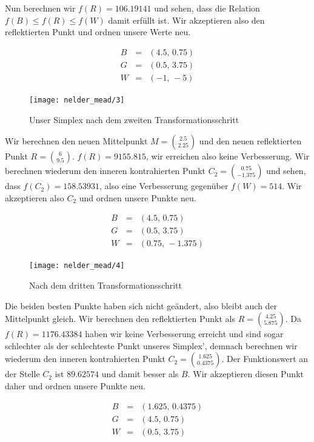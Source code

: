 \documentclass[naustrian]{article}
\begin{document}
{Nun berechnen wir $f(R) = 106.19141$ und sehen, dass die Relation $f(B) \leq
f(R) \leq f(W)$ damit erfüllt ist. Wir akzeptieren also den reflektierten Punkt
und ordnen unsere Werte neu.

\begin{eqnarray*}
    B & = & (4.5, \, 0.75)\\
    G & = & (0.5,\,3.75)\\
    W & = & (-1,\,-5)
\end{eqnarray*}

\begin{figure}[H]
    \centering
    \texttt{[image: nelder\_mead/3]}
    \caption{Unser Simplex nach dem zweiten Transformationsschritt}
\end{figure}

Wir berechnen den neuen Mittelpunkt $M = \binom{2.5}{2.25}$ und den neuen
reflektierten Punkt $R = \binom{6}{9.5}$. $f(R) = 9155.815$, wir erreichen also
keine Verbesserung. Wir berechnen wiederum den inneren kontrahierten Punkt
$C_{2} = \binom{0.75}{-1.375}$ und sehen, dass $f(C_{2}) = 158.53931$, also
eine Verbesserung gegenüber $f(W) = 514$. Wir akzeptieren also $C_{2}$ und
ordnen unsere Punkte neu.

\begin{eqnarray*}
    B & = & (4.5, \, 0.75)\\
    G & = & (0.5,\,3.75)\\
    W & = & (0.75,\,-1.375)
\end{eqnarray*}

\begin{figure}[H]
    \centering
    \texttt{[image: nelder\_mead/4]}
    \caption{Nach dem dritten Transformationsschritt}
\end{figure}

Die beiden besten Punkte haben sich nicht geändert, also bleibt auch der
Mittelpunkt gleich. Wir berechnen den reflektierten Punkt als $R =
\binom{4.25}{5.875}$. Da $f(R) = 1176.43384$ haben wir keine Verbesserung
erreicht und sind sogar schlechter als der schlechteste Punkt unseres Simplex',
demnach berechnen wir wiederum den inneren kontrahierten Punkt $C_{2} =
\binom{1.625}{0.4375}$. Der Funktionswert an der Stelle $C_{2}$ ist $89.62574$
und damit besser als $B$. Wir akzeptieren diesen Punkt daher und ordnen unsere
Punkte neu.

\begin{eqnarray*}
    B & = & (1.625,\,0.4375)\\
    G & = & (4.5, \, 0.75)\\
    W & = & (0.5,\,3.75)
\end{eqnarray*}

}
\end{document}

